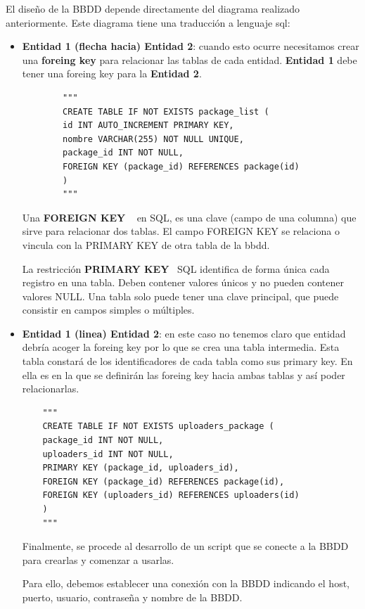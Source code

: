 \documentclass[a4paper, 12pt]{book}
\begin{document}
El diseño de la BBDD depende directamente del diagrama realizado anteriormente. 
Este diagrama tiene una traducción a lenguaje sql:
\begin{itemize}
	\item \textbf {Entidad 1 (flecha hacia) Entidad 2}: cuando esto ocurre necesitamos crear una \textbf {foreing key} para relacionar las tablas de cada entidad. \textbf {Entidad 1} debe tener una foreing key para la \textbf {Entidad 2}.
	
	\begin{verbatim}
		"""
		CREATE TABLE IF NOT EXISTS package_list (
		id INT AUTO_INCREMENT PRIMARY KEY,
		nombre VARCHAR(255) NOT NULL UNIQUE,
		package_id INT NOT NULL,
		FOREIGN KEY (package_id) REFERENCES package(id)
		)
		"""
	\end{verbatim}
	
	Una \textbf {FOREIGN KEY} ~\cite{thedataschool:_foreingkey} en SQL, es una clave (campo de una columna) que sirve para relacionar dos tablas. El campo FOREIGN KEY se relaciona o vincula con la PRIMARY KEY de otra tabla de la bbdd.
	
	La restricción \textbf {PRIMARY KEY}~\cite{thedataschool:_primarykeyen} SQL identifica de forma única cada registro en una tabla.
	Deben contener valores únicos y no pueden contener valores NULL.
	Una tabla solo puede tener una clave principal, que puede consistir en campos simples o múltiples.
	
	\item \textbf {{Entidad 1 (linea) Entidad 2}}: en este caso no tenemos claro que entidad debría acoger la foreing key por lo que se crea una tabla intermedia.
	Esta tabla constará de los identificadores de cada tabla como sus primary key.
	En ella es en la que se definirán las foreing key hacia ambas tablas y así poder relacionarlas.
	
	\begin{verbatim}
	"""
	CREATE TABLE IF NOT EXISTS uploaders_package (
	package_id INT NOT NULL,
	uploaders_id INT NOT NULL,
	PRIMARY KEY (package_id, uploaders_id),
	FOREIGN KEY (package_id) REFERENCES package(id),
	FOREIGN KEY (uploaders_id) REFERENCES uploaders(id)
	)
	"""
	\end{verbatim}
	
	Finalmente, se procede al desarrollo de un script que se conecte a la BBDD para crearlas y comenzar a usarlas.
	
	Para ello, debemos establecer una conexión con la BBDD indicando el host, puerto, usuario, contraseña y nombre de la BBDD.
	

\end{itemize}
\end{document}
